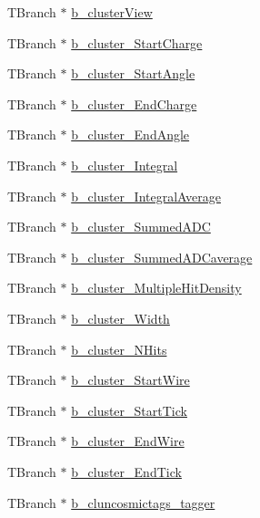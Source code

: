 \begin{DoxyCompactItemize}
\item 
T\-Branch $\ast$ \hyperlink{classanatree_a3dd99c1458502b95769e28e970ac4358}{b\-\_\-cluster\-View}
\item 
T\-Branch $\ast$ \hyperlink{classanatree_a6e674f8fed09644c85d76b31163ea638}{b\-\_\-cluster\-\_\-\-Start\-Charge}
\item 
T\-Branch $\ast$ \hyperlink{classanatree_a72c8b71bbd6fc4e96da67640c94f51e1}{b\-\_\-cluster\-\_\-\-Start\-Angle}
\item 
T\-Branch $\ast$ \hyperlink{classanatree_a5540328dd89b297a67f4c354e8abc598}{b\-\_\-cluster\-\_\-\-End\-Charge}
\item 
T\-Branch $\ast$ \hyperlink{classanatree_ad6e7df50c518750daa91c7f447ee9a04}{b\-\_\-cluster\-\_\-\-End\-Angle}
\item 
T\-Branch $\ast$ \hyperlink{classanatree_a4a45463d85ac0494284b863cf82d9416}{b\-\_\-cluster\-\_\-\-Integral}
\item 
T\-Branch $\ast$ \hyperlink{classanatree_a42c14008297e2742a79b13140d105054}{b\-\_\-cluster\-\_\-\-Integral\-Average}
\item 
T\-Branch $\ast$ \hyperlink{classanatree_a1bb7cf91bff421bef31aaf87725e904f}{b\-\_\-cluster\-\_\-\-Summed\-A\-D\-C}
\item 
T\-Branch $\ast$ \hyperlink{classanatree_ab7023e11831e39619f69edf88400a0a7}{b\-\_\-cluster\-\_\-\-Summed\-A\-D\-Caverage}
\item 
T\-Branch $\ast$ \hyperlink{classanatree_a3ad1ce127e92e536189b2614477a49c5}{b\-\_\-cluster\-\_\-\-Multiple\-Hit\-Density}
\item 
T\-Branch $\ast$ \hyperlink{classanatree_a7a61097f1417a99882831d6bbe533b2a}{b\-\_\-cluster\-\_\-\-Width}
\item 
T\-Branch $\ast$ \hyperlink{classanatree_a0689fef71e05e95cb2ddb854c5201995}{b\-\_\-cluster\-\_\-\-N\-Hits}
\item 
T\-Branch $\ast$ \hyperlink{classanatree_aeec86e185d9e0bc3163fc88cdb6019da}{b\-\_\-cluster\-\_\-\-Start\-Wire}
\item 
T\-Branch $\ast$ \hyperlink{classanatree_a5be78fd80b6792d715e6214a52a7daac}{b\-\_\-cluster\-\_\-\-Start\-Tick}
\item 
T\-Branch $\ast$ \hyperlink{classanatree_aac8d0d8d9cb33a643c3dab8c288b359e}{b\-\_\-cluster\-\_\-\-End\-Wire}
\item 
T\-Branch $\ast$ \hyperlink{classanatree_ab16577aff6679ce7ae82fa9a4adbc9c7}{b\-\_\-cluster\-\_\-\-End\-Tick}
\item 
T\-Branch $\ast$ \hyperlink{classanatree_abe945439379a574fc5b69fc4ee2453ed}{b\-\_\-cluncosmictags\-\_\-tagger}

\end{DoxyCompactItemize}
